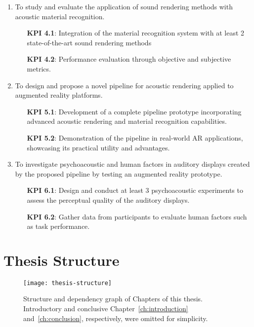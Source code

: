 \begin{enumerate}
    \item To study and evaluate the application of sound rendering methods with acoustic material recognition.
        \begin{itemize}
            \item[\textbf{KPI 4.1}:] Integration of the material recognition system with at least 2 state-of-the-art sound rendering methods
            \item[\textbf{KPI 4.2}:] Performance evaluation through objective and subjective metrics.
        \end{itemize}
    \item To design and propose a novel pipeline for acoustic rendering applied to augmented reality platforms.
        \begin{itemize}
            \item[\textbf{KPI 5.1}:] Development of a complete pipeline prototype incorporating advanced acoustic rendering and material recognition capabilities.
            \item[\textbf{KPI 5.2}:] Demonstration of the pipeline in real-world AR applications, showcasing its practical utility and advantages.
        \end{itemize}
    \item To investigate psychoacoustic and human factors in auditory displays created by the proposed pipeline by testing an augmented reality prototype.
        \begin{itemize}
            \item[\textbf{KPI 6.1}:] Design and conduct at least 3 psychoacoustic experiments to assess the perceptual quality of the auditory displays.
            \item[\textbf{KPI 6.2}:] Gather data from participants to evaluate human factors such as task performance.
        \end{itemize}
\end{enumerate}

\section{Thesis Structure}
\begin{figure}[htbp]
    \centering
    \texttt{[image: thesis-structure]}
    \caption[Thesis structure overview]{Structure and dependency graph of Chapters of this thesis. Introductory and conclusive Chapter~\ref{ch:introduction} and~\ref{ch:conclusion}, respectively, were omitted for simplicity.}
    \label{fig:thesis-structure}
\end{figure}

